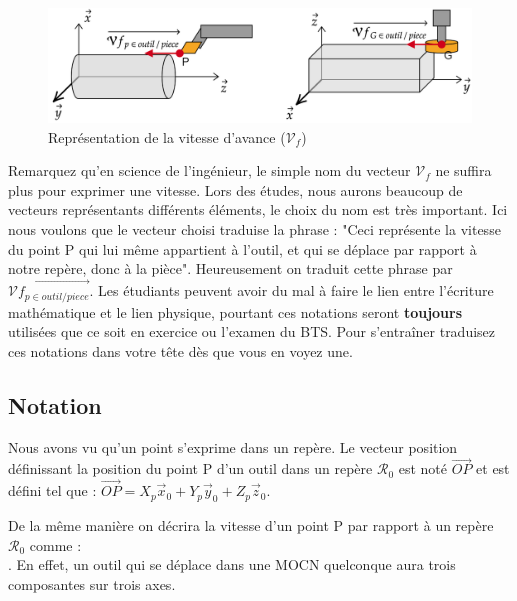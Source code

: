 \documentclass[
	11pt, %
	fleqn, %
	a4paper, %
]{LegrandOrangeBook}
\begin{document}
\begin{figure}[H]  %
	\centering %
	\includegraphics[width=1\textwidth]{Images/vit1.png} %
    \caption{Représentation de la vitesse d'avance ($\mathcal{V}_f$)}
	\label{vet1} %
\end{figure}

Remarquez qu'en science de l'ingénieur, le simple nom du vecteur $\mathcal{V}_f$ ne suffira plus pour exprimer une vitesse. Lors des études, nous aurons beaucoup de vecteurs représentants différents éléments, le choix du nom est très important. Ici nous voulons que le vecteur choisi traduise la phrase : "Ceci représente la vitesse du point P qui lui même appartient à l'outil, et qui se déplace par rapport à notre repère, donc à la pièce". Heureusement on traduit cette phrase par $\overrightarrow{\mathcal{V}f_{p \in outil / piece}}$. Les étudiants peuvent avoir du mal à faire le lien entre l'écriture mathématique et le lien physique, pourtant ces notations seront \textbf{toujours} utilisées que ce soit en exercice ou l'examen du BTS. Pour s'entraîner traduisez ces notations dans votre tête dès que vous en voyez une.

\subsection{Notation}

Nous avons vu qu'un point s'exprime dans un repère. Le vecteur position définissant la position du point P d'un outil dans un repère $\mathcal{R}_0$ est noté $\overrightarrow{OP}$ et est défini tel que : $\overrightarrow{OP} = X_p \vec{x}_0 + Y_p \vec{y}_0 + Z_p \vec{z}_0$.

De la même manière on décrira la vitesse d'un point P par rapport à un repère $\mathcal{R}_0$ comme : \\

 . En effet, un outil qui se déplace dans une MOCN quelconque aura trois composantes sur trois axes. \\
\end{document}
